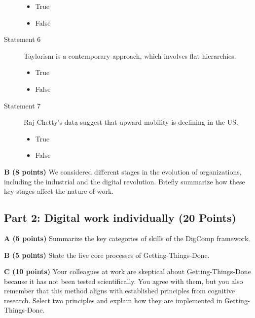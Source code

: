 \documentclass[12pt]{scrartcl}
\begin{document}
\begin{description}
	\begin{multicols}{2}
		\begin{itemize}[label={\Square}]
			\item True
			\item False
		\end{itemize}
	\end{multicols}

	\item[Statement 6] Taylorism is a contemporary approach, which involves flat hierarchies.

	\begin{multicols}{2}
		\begin{itemize}[label={\Square}]
			\item True
			\item False
		\end{itemize}
	\end{multicols}

	\item[Statement 7 ] Raj Chetty's data suggest that upward mobility is declining in the US.

	\begin{multicols}{2}
		\begin{itemize}[label={\Square}]
			\item True
			\item False
		\end{itemize}
	\end{multicols}

\end{description}

\textbf{B (8 points)} We considered different stages in the evolution of organizations, including the industrial and the digital revolution. Briefly summarize how these key stages affect the nature of work.

\subsection*{Part 2: Digital work individually (20 Points)}

\textbf{A (5 points)} Summarize the key categories of skills of the DigComp framework.

\vspace{0.3cm}

\textbf{B (5 points)} State the five core processes of Getting-Things-Done.

\vspace{0.3cm}
\textbf{C (10 points)} Your colleagues at work are skeptical about Getting-Things-Done because it has not been tested scientifically. You agree with them, but you also remember that this method aligns with established principles from cognitive research. Select two principles and explain how they are implemented in Getting-Things-Done.
 
\end{document}

